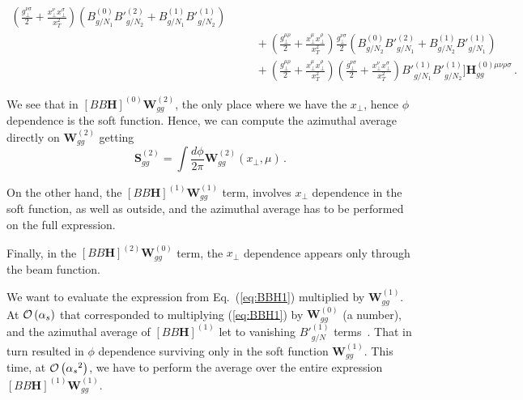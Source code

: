 \documentclass[a4paper,11pt]{report}
\numberwithin{equation}{section}
\newcommand{\bfH}{\bm{H}}
\begin{document}
\begin{eqnarray}
  \left(\frac{g_\perp^{\nu\sigma}}{2}+
        \frac{x_\perp^\nu x_\perp^\sigma}{x_T^2}\right)
  \left(
  B_{g/N_1}^{(0)} {B'}_{g/N_2}^{(2)} + B_{g/N_1}^{(1)} {B'}_{g/N_2}^{(1)} 
  \right)
  \nonumber \\
  & & 
  \quad +
  \left(\frac{g_\perp^{\mu\rho}}{2}+
  \frac{x_\perp^\mu x_\perp^\rho}{x_T^2}\right) 
  \frac{g_\perp^{\nu\sigma}}{2} 
  \left(
  B_{g/N_2}^{(0)} {B'}_{g/N_1}^{(2)} + B_{g/N_2}^{(1)} {B'}_{g/N_1}^{(1)} 
  \right)
  \nonumber \\
  & & 
  \quad +
  \left(\frac{g_\perp^{\mu\rho}}{2}+
  \frac{x_\perp^\mu x_\perp^\rho}{x_T^2}\right) 
  \left(\frac{g_\perp^{\nu\sigma}}{2}+
        \frac{x_\perp^\nu x_\perp^\sigma}{x_T^2}\right)
  {B'}_{g/N_1}^{(1)} {B'}_{g/N_2}^{(1)}
  \Bigg] 
  \bm{H}^{(0) \mu\nu\rho\sigma}_{gg}\,.
\end{eqnarray}

We see that in $[BB\bfH]^{(0)}\bm{W}^{(2)}_{gg}$, the only place where we have the
$x_\perp$, hence $\phi$ dependence is the soft function. Hence, we can compute
the azimuthal average directly on $\bm{W}^{(2)}_{gg}$ getting
%
\begin{equation}
  \bm{S}^{(2)}_{gg}  = 
  \int \frac{d\phi}{2\pi} \bm{W}^{(2)}_{gg}(x_\perp,\mu)\,.
\end{equation}

On the other hand, the $[BB\bfH]^{(1)}\bm{W}^{(1)}_{gg}$ term, involves 
$x_\perp$ dependence in the soft function, as well as outside, and the azimuthal
average has to be performed on the full expression.

Finally, in the $[BB\bfH]^{(2)}\bm{W}^{(0)}_{gg}$ term, the $x_\perp$ dependence
appears only through the beam function.

We want to evaluate the expression from Eq.~(\ref{eq:BBH1}) multiplied by
$\bm{W}^{(1)}_{gg}$. At ${{\cal O}\left({\alpha_s}\right)}$ that corresponded
to multiplying (\ref{eq:BBH1}) by $\bm{W}^{(0)}_{gg}$ (a number), and
the azimuthal average of $[BB\bfH]^{(1)}$ let to vanishing ${B'}^{(1)}_{g/N}$
terms~\cite{Li:2013mia}.
%
That in turn resulted in $\phi$ dependence surviving only in the soft function
$\bm{W}^{(1)}_{gg}$. This time, \ie at ${{\cal O}\left({\alpha_s}^2\right)}$, we have to perform the
average over the entire expression $[BB\bfH]^{(1)}\bm{W}^{(1)}_{gg}$.
\end{document}
